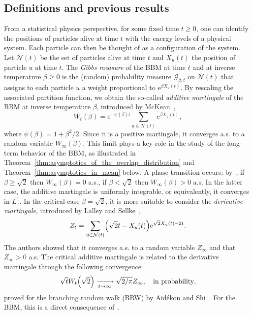 \documentclass[10pt]{amsart}
\theoremstyle{definition}\newtheorem{defi}[theo]{Definition}\newtheorem{rema}[theo]{Remark}\newtheorem{exam}[theo]{Example}\newtheorem{exem}[theo]{Example}\newtheorem{nota}[theo]{Notation}
\newcommand{\e}{\mathrm{e}}
\newcommand\1{\mathds{1}}
\newcommand{\cG}{\mathcal{G}}
\newcommand{\cN}{\mathcal{N}}
\let\originalleft\left
\let\originalright\right
\renewcommand{\left}{\mathopen{}\mathclose\bgroup\originalleft}
\renewcommand{\right}{\aftergroup\egroup\originalright}
\renewcommand*{\to}{\mathchoice{\longrightarrow}{\rightarrow}{\rightarrow}{\rightarrow}}
\begin{document}
\subsection{Definitions and previous results}

From a statistical physics perspective, for some fixed time $t \geq 0$, one can identify the positions of particles alive at time $t$ with the energy levels of a physical system. Each particle can then be thought of as a configuration of the system. Let $\cN(t)$ be the set of particles alive at time $t$ and $X_u(t)$ the position of particle $u$ at time $t$. The \emph{Gibbs measure} of the BBM at time $t$ and at inverse temperature $\beta \geq 0$ is the (random) probability measure $\cG_{\beta, t}$ on $\cN(t)$ that assigns to each particle $u$ a weight proportional to $\e^{\beta X_u(t)}$. By rescaling the associated partition function, we obtain the so-called \emph{additive martingale} of the BBM at inverse temperature $\beta$, introduced by McKean~\cite{McKean1975},
\begin{equation}\label{eq:definition_additive_martingale}
W_t(\beta) = \e^{-\psi(\beta)t} \sum_{u \in \cN(t)} \e^{\beta X_u(t)},
\end{equation}
where $\psi(\beta) = 1 + \beta^2/2$. Since it is a positive martingale, it converges a.s. to a random variable $W_\infty(\beta)$. This limit plays a key role in the study of the long-term behavior of the BBM, as illustrated in Theorem~\ref{thm:asymptotics_of_the_overlap_distribution} and Theorem~\ref{thm:asymptotics_in_mean} below. A phase transition occurs: by~\cite[Proposition~1]{Neveu1988}, if $\beta \geq \sqrt{2}$ then $W_\infty(\beta) = 0$ a.s., if $\beta < \sqrt{2}$ then $W_\infty(\beta) > 0$ a.s. In the latter case, the additive martingale is uniformly integrable, or equivalently, it converges in $L^1$. In the critical case $\beta = \sqrt{2}$, it is more suitable to consider the \emph{derivative martingale}, introduced by Lalley and Sellke~\cite{LalleySellke1987},
\begin{equation}\label{eq:definition_derivative_martingale}
Z_t = \sum_{u \in \cN(t)} \left(\sqrt{2}t - X_u(t)\right) \e^{\sqrt{2}X_u(t) - 2t}.
\end{equation}
The authors showed that it converges a.s. to a random variable $Z_\infty$ and that $Z_\infty > 0$ a.s. The critical additive martingale is related to the derivative martingale through the following convergence
\begin{equation}\label{eq:convergence_critical_additive_martingale}
\sqrt{t} W_t\left(\sqrt{2}\right) \xrightarrow[t \to \infty]{} \sqrt{2 \smash{/}\pi} Z_\infty, \quad \text{in probability},
\end{equation}
proved for the branching random walk (BRW) by A\"{i}dékon and Shi~\cite{AidekonShi2014}. For the BBM, this is a direct consequence of~\cite[Proposition~2.2]{MaillardPain2019}.
\end{document}

